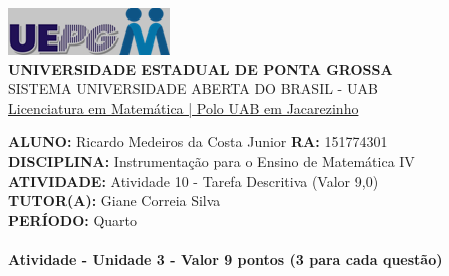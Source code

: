 \documentclass[a4paper, 12pt]{article}
\begin{document}
\begin{flushleft}\includegraphics{logo}\\
\textbf{UNIVERSIDADE ESTADUAL DE PONTA GROSSA} \\
SISTEMA UNIVERSIDADE ABERTA DO BRASIL - UAB \\
\underline{Licenciatura em Matemática | Polo UAB em Jacarezinho}\end{flushleft} 
\textbf{ALUNO:} Ricardo Medeiros da Costa Junior   \textbf{RA:} 151774301 \\
\textbf{DISCIPLINA:} Instrumentação para o Ensino de Matemática IV \\
\textbf{ATIVIDADE:} Atividade 10 - Tarefa Descritiva (Valor 9,0)\\ 
\textbf{TUTOR(A):} Giane Correia Silva \\
\textbf{PERÍODO:} Quarto \\\\
\textbf{Atividade - Unidade 3 - Valor 9 pontos  (3 para cada questão)}\\
\end{document}
